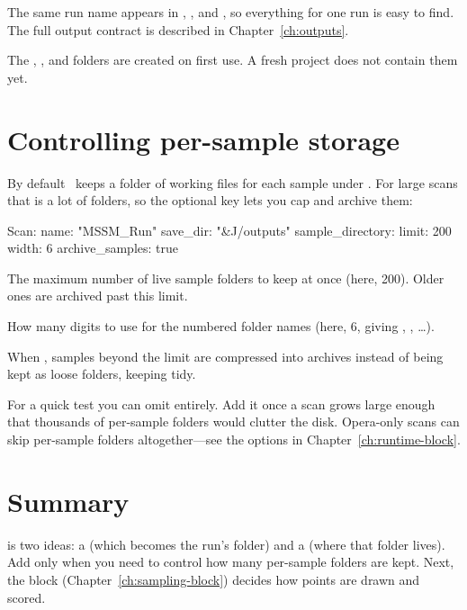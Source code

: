 \noindent The same run name appears in , , and , so
everything for one run is easy to find. The full output contract is described in
Chapter~\ref{ch:outputs}.

\begin{jnote}
The , , and  folders are created on first use. A fresh
project does not contain them yet.
\end{jnote}

\section{Controlling per-sample storage}
\label{sec:scan-sample-directory}

By default \Jarvis\ keeps a folder of working files for each sample under . For
large scans that is a lot of folders, so the optional  key lets you
cap and archive them:

\begin{yamlwin}
Scan:
  name: "MSSM_Run"
  save_dir: "&J/outputs"
  sample_directory:
    limit: 200
    width: 6
    archive_samples: true
\end{yamlwin}

\begin{description}[style=nextline, leftmargin=1.2em]
  \item[\yamlkey{limit}] The maximum number of live sample folders to keep at once (here, 200).
        Older ones are archived past this limit.
  \item[\yamlkey{width}] How many digits to use for the numbered folder names (here, 6, giving
        , , \ldots).
  \item[\yamlkey{archive\_samples}] When , samples beyond the limit are compressed
        into archives instead of being kept as loose folders, keeping  tidy.
\end{description}

\begin{jtip}
For a quick test you can omit  entirely. Add it once a scan grows
large enough that thousands of per-sample folders would clutter the disk. Opera-only scans can
skip per-sample folders altogether---see the  options in
Chapter~\ref{ch:runtime-block}.
\end{jtip}

\section{Summary}
\label{sec:scan-summary}

 is two ideas: a  (which becomes the run's folder) and a
 (where that folder lives). Add  only when you need
to control how many per-sample folders are kept. Next, the  block
(Chapter~\ref{ch:sampling-block}) decides how points are drawn and scored.
